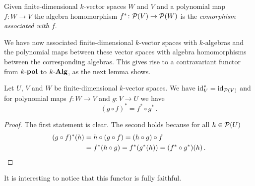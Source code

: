 \begin{definition}
  Given finite-dimensional $k$-vector spaces $W$ and $V$ and a polynomial map $f \colon W \to V$ the algebra homomorphism $f^* \colon \mathcal{P}(V) \to \mathcal{P}(W)$ is the \emph{comorphism associated with $f$}.
\end{definition}
  

We have now associated finite-dimensional $k$-vector spaces with $k$-algebras and the polynomial maps between these vector spaces with algebra homomorphisms between the corresponding algebras.
This gives rise to a contravariant functor from $k\text{-}\mathbf{pol}$ to $k\text{-}\mathbf{Alg}$, as the next lemma shows.


\begin{proposition}
  Let $U$, $V$ and $W$ be finite-dimensional $k$-vector spaces.
  We have $\operatorname{id}_V^* = \operatorname{id}_{\mathcal{P}(V)}$ and for polynomial maps $f \colon W \to V$ and $g \colon V \to U$ we have
  \[
      (g \circ f)^*
    = f^* \circ g^* \,.
  \]
\end{proposition}
\begin{proof}
  The first statement is clear.
  The second holds because for all $h \in \mathcal{P}(U)$
  \begin{align*}
      ( g \circ f)^*(h)
    &=  h \circ (g \circ f)
     =  (h \circ g) \circ f \\
    &=  f^* (h \circ g)
     =  f^*(g^*(h))
     = (f^* \circ g^*)(h) \,.
    \qedhere
  \end{align*}
\end{proof}


It is interesting to notice that this functor is fully faithful.



